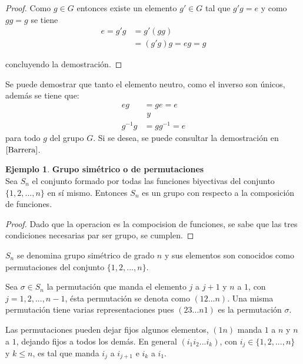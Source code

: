 \documentclass[11pt]{book}
\theoremstyle{definition}
\newtheorem{example}{Ejemplo}
\begin{document}
\begin{proof}
 Como $g\in G$ entonces existe un elemento $g'\in G$ tal
que $g'g=e$ y como $gg=g$ se tiene
\begin{equation*}
  \begin{split}
    e=g'g&=g'(gg)\\
    &=(g'g)g=eg=g
  \end{split}
\end{equation*}

concluyendo la demostración.
\end{proof}

Se puede demostrar que tanto el elemento neutro, como el inverso son
únicos, además se tiene que:
\begin{equation*}
\begin{split}
eg&=ge=e\\ 
& \textit{    y   }\\
 g^{-1}g&=gg^{-1}=e
\end{split}
\end{equation*}
para todo  $g$ del grupo $G$. Si se desea, se puede consultar la demostración
en $\cite{Barrera}$.

\begin{example}\textbf{Grupo simétrico o de
    permutaciones}\\
  Sea $S_n$ el conjunto formado por todas las funciones
  biyectivas del conjunto $\{1,2,...,n \}$ en sí mismo. Entonces $S_n$ es un
  grupo con respecto a la composición de funciones.


\begin{proof}

Dado que la operacion es la compocision de funciones, se sabe que las
tres condiciones necesarias par ser grupo, se cumplen. 
\end{proof}

  $S_n$ se denomina grupo simétrico de grado $n$ y sus elementos son
  conocidos como permutaciones del conjunto $\{1,2,...,n\}$.
\end{example}

Sea $\sigma \in S_n$ la permutación que manda el elemento $j$ a $j+1$
y $n$ a $1$, con $j=1,2,...,n-1$, ésta permutación se denota como
$(12...n)$. Una misma permutación tiene varias representaciones pues
$(23...n1)$ es la permutación $\sigma$.

Las permutaciones pueden dejar fijos algunos elementos, $(1n)$ manda
$1$ a $n$ y $n$ a $1$, dejando fijos a todos los demás. En general
$(i_1i_2...i_k)$, con $i_j\in \{ 1,2,...,n\}$ y $k\le n$, es tal que
manda $i_j$ a $i_{j+1}$ e $i_k$ a $i_1$.
\end{document}
